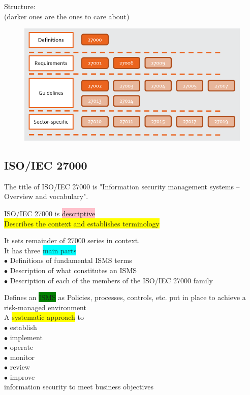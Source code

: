 \documentclass[tikz,border=10pt]{project_plan}
\newcommand{\bulletPoint}{\hspace{-3.1pt}$\bullet$ \hspace{5pt}}
\begin{document}
\newpage

Structure:\\
(darker ones are the ones to care about)\\
\begin{figure}[h!]
  \centering
  \includegraphics[width=\linewidth]{ISO_IEC_27000_series_structure.png}
\end{figure}

\subsection{ISO/IEC 27000}
The title of ISO/IEC 27000 is "Information security management systems – Overview and vocabulary".

ISO/IEC 27000 is \colorbox{pink}{descriptive}\\
\colorbox{yellow}{Describes the context and establishes terminology}

It sets remainder of 27000 series in context.\\
It has three \colorbox{cyan}{main parts}\\
\bulletPoint Definitions of fundamental ISMS terms\\
\bulletPoint Description of what constitutes an ISMS\\
\bulletPoint Description of each of the members of the ISO/IEC 27000 family

Defines an \colorbox{green}{ISMS} as Policies, processes, controls, etc. put in place to achieve a risk-managed environment\\
A \colorbox{yellow}{systematic approach} to\\
\bulletPoint establish\\
\bulletPoint implement\\
\bulletPoint operate\\
\bulletPoint monitor\\
\bulletPoint review\\
\bulletPoint improve\\
information security to meet business objectives
\end{document}
